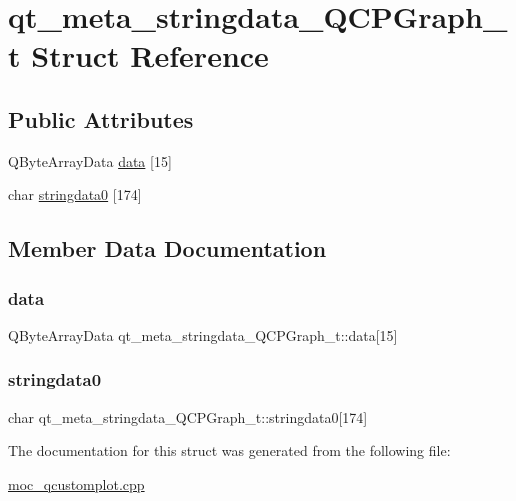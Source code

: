 \hypertarget{structqt__meta__stringdata__QCPGraph__t}{}\section{qt\+\_\+meta\+\_\+stringdata\+\_\+\+Q\+C\+P\+Graph\+\_\+t Struct Reference}
\label{structqt__meta__stringdata__QCPGraph__t}
\subsection*{Public Attributes}
\begin{DoxyCompactItemize}
\item 
Q\+Byte\+Array\+Data \mbox{\hyperlink{structqt__meta__stringdata__QCPGraph__t_a070d55ece907072898e987f8594e5776}{data}} \mbox{[}15\mbox{]}
\item 
char \mbox{\hyperlink{structqt__meta__stringdata__QCPGraph__t_a50b082c96ddea75773a05144ba6d44ca}{stringdata0}} \mbox{[}174\mbox{]}
\end{DoxyCompactItemize}


\subsection{Member Data Documentation}
\mbox{\label{structqt__meta__stringdata__QCPGraph__t_a070d55ece907072898e987f8594e5776}} 
\subsubsection{\texorpdfstring{data}{data}}
{\footnotesize\ttfamily Q\+Byte\+Array\+Data qt\+\_\+meta\+\_\+stringdata\+\_\+\+Q\+C\+P\+Graph\+\_\+t\+::data\mbox{[}15\mbox{]}}

\mbox{\label{structqt__meta__stringdata__QCPGraph__t_a50b082c96ddea75773a05144ba6d44ca}} 
\subsubsection{\texorpdfstring{stringdata0}{stringdata0}}
{\footnotesize\ttfamily char qt\+\_\+meta\+\_\+stringdata\+\_\+\+Q\+C\+P\+Graph\+\_\+t\+::stringdata0\mbox{[}174\mbox{]}}



The documentation for this struct was generated from the following file\+:\begin{DoxyCompactItemize}
\item 
\mbox{\hyperlink{moc__qcustomplot_8cpp}{moc\+\_\+qcustomplot.\+cpp}}\end{DoxyCompactItemize}
